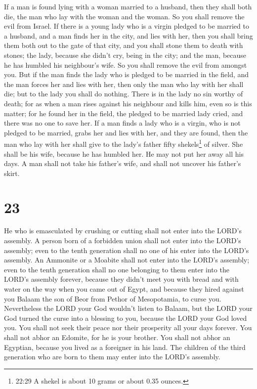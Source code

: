  If a man is found lying with a woman married to a husband,
then they shall both die, the man who lay with the woman and the woman.
So you shall remove the evil from Israel.  If there is a
young lady who is a virgin pledged to be married to a husband, and a man
finds her in the city, and lies with her,  then you shall
bring them both out to the gate of that city, and you shall stone them
to death with stones; the lady, because she didn't cry, being in the
city; and the man, because he has humbled his neighbour's wife. So you
shall remove the evil from amongst you.  But if the man
finds the lady who is pledged to be married in the field, and the man
forces her and lies with her, then only the man who lay with her shall
die;  but to the lady you shall do nothing. There is in the
lady no sin worthy of death; for as when a man rises against his
neighbour and kills him, even so is this matter;  for he
found her in the field, the pledged to be married lady cried, and there
was no one to save her.  If a man finds a lady who is a
virgin, who is not pledged to be married, grabs her and lies with her,
and they are found,  then the man who lay with her shall
give to the lady's father fifty shekels\footnote{22:29 A shekel is about
  10 grams or about 0.35 ounces.} of silver. She shall be his wife,
because he has humbled her. He may not put her away all his days.
 A man shall not take his father's wife, and shall not
uncover his father's skirt.

\hypertarget{section-22}{%
\section{23}\label{section-22}}

 He who is emasculated by crushing or cutting shall not
enter into the LORD's assembly.  A person born of a
forbidden union shall not enter into the LORD's assembly; even to the
tenth generation shall no one of his enter into the LORD's assembly.
 An Ammonite or a Moabite shall not enter into the LORD's
assembly; even to the tenth generation shall no one belonging to them
enter into the LORD's assembly forever,  because they didn't
meet you with bread and with water on the way when you came out of
Egypt, and because they hired against you Balaam the son of Beor from
Pethor of Mesopotamia, to curse you.  Nevertheless the LORD
your God wouldn't listen to Balaam, but the LORD your God turned the
curse into a blessing to you, because the LORD your God loved you.
 You shall not seek their peace nor their prosperity all
your days forever.  You shall not abhor an Edomite, for he
is your brother. You shall not abhor an Egyptian, because you lived as a
foreigner in his land.  The children of the third generation
who are born to them may enter into the LORD's assembly.

